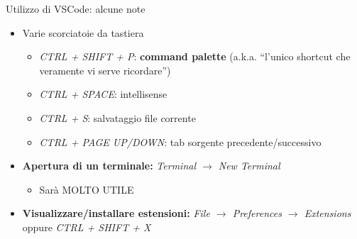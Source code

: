 \documentclass[xcolor=dvipsnames,presentation]{beamer}
\begin{document}
\begin{frame}{Utilizzo di VSCode: alcune note}

\begin{itemize}
\item Varie scorciatoie da tastiera
	\begin{itemize}
	\item \emph{CTRL + SHIFT + P}: \textbf{command palette} (a.k.a. ``l'unico shortcut che veramente vi serve ricordare'')
	\item \emph{CTRL + SPACE}: intellisense
	\item \emph{CTRL + S}: salvataggio file corrente
	\item \emph{CTRL + PAGE UP/DOWN}: tab sorgente precedente/successivo
	\end{itemize}
\item \textbf{Apertura di un terminale:} \emph{Terminal $\to$ New Terminal}
	\begin{itemize}
	\item Sarà MOLTO UTILE
	\end{itemize}
\item \textbf{Visualizzare/installare estensioni:} \emph{File $\to$ Preferences $\to$ Extensions} oppure \emph{CTRL + SHIFT + X}
\end{itemize}

\end{frame}
\end{document}

